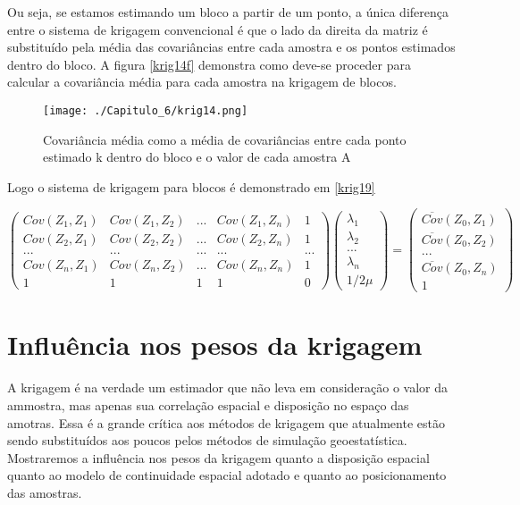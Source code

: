 Ou seja, se estamos estimando um bloco a partir de um ponto, a única diferença entre o sistema de krigagem convencional é que o lado da direita da matriz é substituído pela média das covariâncias entre cada amostra e os pontos estimados dentro do bloco. A figura \eqref{krig14f} demonstra como deve-se proceder para calcular a covariância média para cada amostra na krigagem de blocos.

\begin{figure}[H]
	\centering
	\texttt{[image: ./Capitulo\_6/krig14.png]}
	\caption{Covariância média como a média de covariâncias entre cada ponto estimado k dentro do bloco e o valor de cada amostra A}
	\label{krig14f}
\end{figure}

Logo o sistema de krigagem para blocos é demonstrado em \eqref{krig19}

  \begin{equation}\label{krig19}
  \begin{pmatrix}
  Cov(Z_{1},Z_{1})&Cov(Z_{1},Z_{2})& ... & Cov(Z_{1},Z_{n})& 1\\ 
  Cov(Z_{2},Z_{1})&Cov(Z_{2},Z_{2})& ... & Cov(Z_{2},Z_{n})& 1 \\ 
  ...&...& ...&... & ...\\
  Cov(Z_{n},Z_{1})&Cov(Z_{n},Z_{2})& ... & Cov(Z_{n},Z_{n})& 1\\
  1&1& 1&1& 0
  \end{pmatrix} 
  \begin{pmatrix}
  \lambda _{1}\\ 
  \lambda _{2}\\ 
  ...\\ 
  \lambda _{n}\\
  1/2\mu
  \end{pmatrix}=\begin{pmatrix}
  \overline{Cov}(Z_{0}, Z_{1})\\ 
  \overline{Cov}(Z_{0}, Z_{2})\\  
  ...\\
  \overline{Cov}(Z_{0}, Z_{n})\\
  1
  \end{pmatrix}
  \end{equation}

\section{Influência nos pesos da krigagem}

A krigagem é na verdade um estimador que não leva em consideração o valor da ammostra, mas apenas sua correlação espacial e disposição no espaço das amotras. Essa é a grande crítica aos métodos de krigagem que atualmente estão sendo substituídos aos poucos pelos métodos de simulação geoestatística. Mostraremos a influência nos pesos da krigagem quanto a disposição espacial quanto ao modelo de continuidade espacial adotado e quanto ao posicionamento das amostras. 

